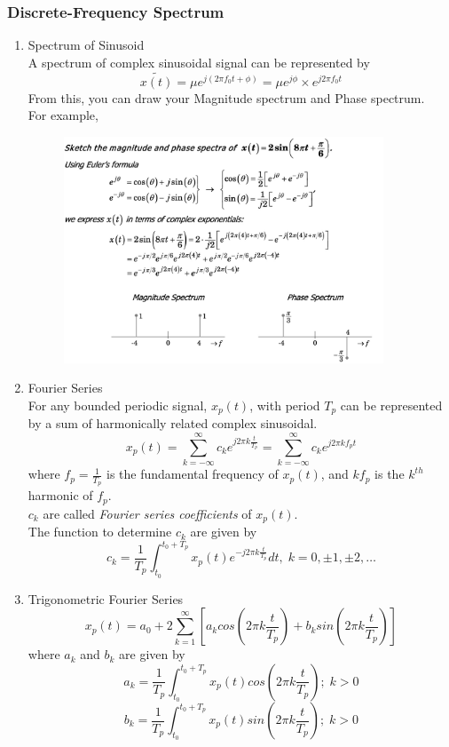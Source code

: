 \documentclass{article}
\begin{document}
\subsubsection{Discrete-Frequency Spectrum}
\begin{enumerate}
    \item Spectrum of Sinusoid \\
    A spectrum of complex sinusoidal signal can be represented by 
    \[ \tilde{x(t)} = \mu e^{j(2\pi f_0t + \phi)} = \mu e^{j\phi}\times e^{j2\pi f_0 t}\]
    From this, you can draw your Magnitude spectrum and Phase spectrum. \\
    For example, 
    \begin{figure}[h]
        \centering
        \includegraphics[width=0.9\textwidth]{image/magnitude_example.jpg}
        \label{fig:enter-label}
    \end{figure}
    \item Fourier Series \\
    For any bounded periodic signal, $x_p(t)$, with period $T_p$ can be represented by a sum of harmonically related complex sinusoidal.
    \begin{equation}
        x_p(t) = \sum^{\infty}_{k=-\infty}c_k e^{j2\pi k \frac{t}{T_p}} = \sum^{\infty}_{k=-\infty}c_k e^{j2\pi kf_p t}
    \end{equation}
    where $f_p = \frac{1}{T_p}$ is the fundamental frequency of $x_p(t)$, and $kf_p$ is the $k^{th}$ harmonic of $f_p$. \\
    $c_k$ are called \textit{Fourier series coefficients} of $x_p(t)$. \\
    The function to determine $c_k$ are given by
    \begin{equation}
        c_k = \frac{1}{T_p}\int^{t_0+T_p}_{t_0}x_p(t)e^{-j2\pi k \frac{t}{T_p}}dt, \; k=0,\pm1, \pm2, \dots
    \end{equation}
    \item Trigonometric Fourier Series
    \begin{equation}
        x_p(t) = a_0 + 2\sum^{\infty}_{k=1}[a_k cos(2\pi k \frac{t}{T_p})+b_ksin(2\pi k \frac{t}{T_p})]
    \end{equation}
    where $a_k$ and $b_k$ are given by
    \[a_k = \frac{1}{T_p}\int^{t_0+T_p}_{t_0}x_p(t)cos(2\pi k \frac{t}{T_p}); \; k > 0\]
    \[b_k = \frac{1}{T_p}\int^{t_0+T_p}_{t_0}x_p(t)sin(2\pi k \frac{t}{T_p}); \; k > 0\]
\end{enumerate}
\end{document}
